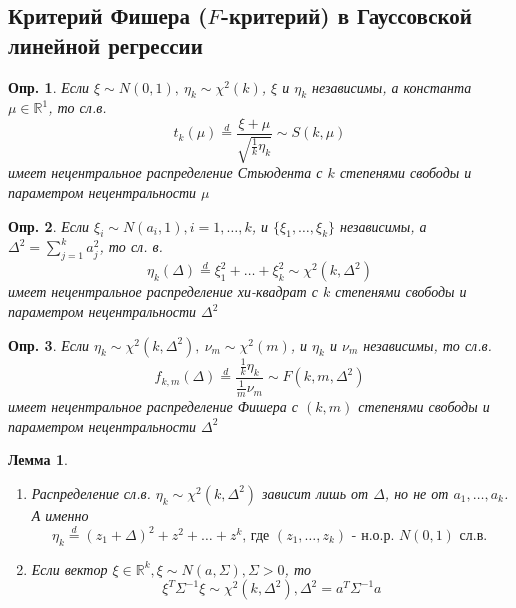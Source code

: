 \documentclass[12pt]{article}
\newtheorem{definition}{Опр.}
\newtheorem{lemma}{Лемма}
\theoremstyle{basic_theorem}
\theoremstyle{name_theorem}
\def\R{ \mathbb{R} }
\begin{document}
\subsection{Критерий Фишера (\(F\)-критерий) в Гауссовской линейной регрессии}
\begin{definition}
        Если \(\xi\sim N(0,1),\ \eta_k\sim\chi^2(k)\), \(\xi\) и \(\eta_k\)
        независимы, а константа \(\mu\in\R^1\), то сл.в.
        \[t_k(\mu)\overset{d}{=}\frac{\xi+\mu}{\sqrt{\frac{1}{k}\eta_k}}\sim S(k,\mu)\]
        имеет нецентральное распределение Стьюдента с \(k\) степенями свободы
        и параметром нецентральности \(\mu\)
\end{definition}
\begin{definition}
    Если \(\xi_i\sim N(a_i,1),i=1,\ldots,k\), и \(\{\xi_1,\ldots,\xi_k\}\)
    независимы, а \(\Delta^2=\sum_{j=1}^{k}a_j^2\), то сл. в.
    \[\eta_k(\Delta)\overset{d}{=}\xi_1^2+\ldots+\xi_k^2\sim\chi^2(k,\Delta^2)\]
    имеет нецентральное распределение хи-квадрат с \(k\) степенями свободы
    и параметром нецентральности \(\Delta^2\)
\end{definition}
\begin{definition}
    Если \(\eta_k\sim\chi^2(k,\Delta^2),\ \nu_m\sim\chi^2(m)\), и \(\eta_k\) и \(\nu_m\)
    независимы, то сл.в.
    \[f_{k,m}(\Delta)\overset{d}{=}\frac{\frac{1}{k}\eta_k}{\frac{1}{m}\nu_m}\sim F(k,m,\Delta^2)\]
    имеет нецентральное распределение Фишера с \((k,m)\) степенями свободы и параметром
    нецентральности \(\Delta^2\)
\end{definition}
\begin{lemma} \label{delta_dependency}
    \begin{enumerate}
        \item Распределение сл.в. \(\eta_k\sim\chi^2(k,\Delta^2)\) зависит лишь
            от \(\Delta\), но не от \(a_1,\ldots,a_k\). А именно
            \[\eta_k\overset{d}{=}(z_1+\Delta)^2+z^2+\ldots+z^k \mbox{, где \((z_1,\ldots,z_k)\) - н.о.р. \(N(0,1)\) сл.в. } \]

        \item Если вектор \(\xi\in\R^k,\xi\sim N(a, \Sigma),\Sigma>0\), то
        \[\xi^T\Sigma^{-1}\xi\sim\chi^2(k,\Delta^2),\Delta^2 = a^{T}\Sigma^{-1}a\]
    \end{enumerate}
\end{lemma}
\end{document}
